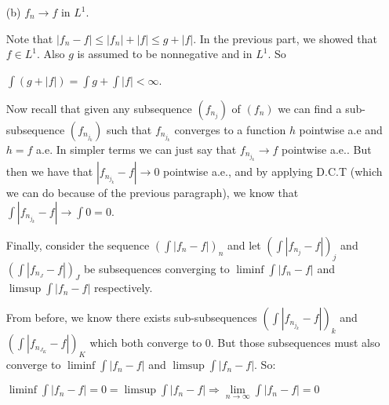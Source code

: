 \documentclass{book}
\newcommand{\exTwoP}{%
   \color{RedViolet}%
   \fontsize{13}{15}\selectfont%
}
\newenvironment{myIndent}{%
   \begin{adjustwidth}{2.5em}{0em}%
}{%
   \end{adjustwidth}%
}
\newcommand{\retTwo}{\hfill\bigbreak}
\begin{document}
\begin{enumerate}
\begin{myIndent}
		By analogous reasoning to $(\int f_{n_J})$, we can show that $\int f = \limsup \int f_n$.\\ So, $\liminf \int f_n = \int f = \limsup \int f_n \Longrightarrow \lim\limits_{n \rightarrow \infty}\int f_n = \int f$.\retTwo
	\end{myIndent}

	\item[(b)] $f_n \rightarrow f$ in $L^1$. 
	
	\begin{myIndent}\exTwoP
		Note that $|f_n - f| \leq |f_n| + |f| \leq g + |f|$. In the previous part, we showed that $f \in L^1$. Also $g$ is assumed to be nonnegative and in $L^1$. So
		
		{\centering $\int (g + |f|) = \int g + \int |f| < \infty$.\retTwo\par}

		Now recall that given any subsequence $(f_{n_j})$ of $(f_n)$ we can find a sub-subsequence $(f_{n_{j_k}})$ such that $f_{n_{j_k}}$ converges to a function $h$ pointwise a.e and $h = f$ a.e. In simpler terms we can just say that $f_{n_{j_k}} \rightarrow f$ pointwise a.e.. But then we have that $|f_{n_{j_k}} - f| \rightarrow 0$ pointwise a.e., and by applying D.C.T (which we can do because of the previous paragraph), we know that $\int |f_{n_{j_k}} - f| \rightarrow \int 0 = 0$.\retTwo

		Finally, consider the sequence $(\int |f_n - f|)_n$ and let $(\int |f_{n_j} - f|)_j$ and\\ $(\int |f_{n_J} - f|)_J$ be subsequences converging to $\liminf \int |f_n - f|$ and\\ $\limsup \int |f_n - f|$ respectively.\retTwo

		From before, we know there exists sub-subsequences $(\int |f_{n_{j_k}} - f|)_k$ and\\ $(\int |f_{n_{J_K}} - f|)_K$ which both converge to $0$. But those subsequences must also converge to $\liminf \int |f_n - f|$ and $\limsup \int |f_n - f|$. So:

		{\centering $\liminf \int |f_n - f| = 0 = \limsup\int |f_n - f| \Longrightarrow \lim\limits_{n \rightarrow \infty} \int |f_n - f| = 0$ \retTwo\par}
	\end{myIndent}
\end{enumerate}
\end{document}
